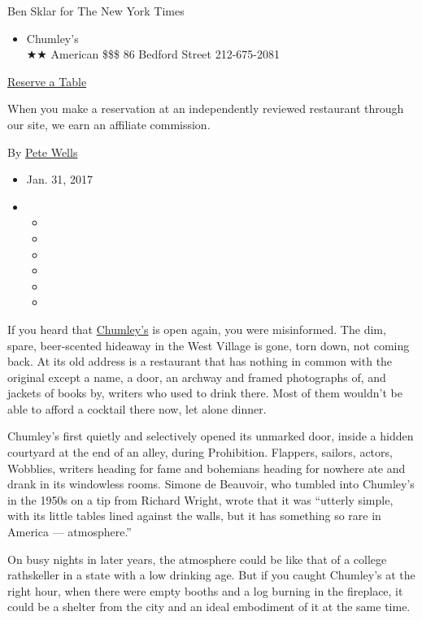 Ben Sklar for The New York Times

\begin{itemize}
\tightlist
\item
  Chumley's\\
  ★★ American \$\$\$ 86 Bedford Street 212-675-2081
\end{itemize}

\href{http://www.opentable.com/single.aspx?ref=4201\&rid=266758}{Reserve
a Table}

When you make a reservation at an independently reviewed restaurant
through our site, we earn an affiliate commission.

By \href{http://www.nytimes3xbfgragh.onion/by/pete-wells}{Pete Wells}

\begin{itemize}
\item
  Jan. 31, 2017
\item
  \begin{itemize}
  \item
  \item
  \item
  \item
  \item
  \item
  \end{itemize}
\end{itemize}

If you heard that \href{http://chumleysnewyork.com/}{Chumley's} is open
again, you were misinformed. The dim, spare, beer-scented hideaway in
the West Village is gone, torn down, not coming back. At its old address
is a restaurant that has nothing in common with the original except a
name, a door, an archway and framed photographs of, and jackets of books
by, writers who used to drink there. Most of them wouldn't be able to
afford a cocktail there now, let alone dinner.

Chumley's first quietly and selectively opened its unmarked door, inside
a hidden courtyard at the end of an alley, during Prohibition. Flappers,
sailors, actors, Wobblies, writers heading for fame and bohemians
heading for nowhere ate and drank in its windowless rooms. Simone de
Beauvoir, who tumbled into Chumley's in the 1950s on a tip from Richard
Wright, wrote that it was ``utterly simple, with its little tables lined
against the walls, but it has something so rare in America ---
atmosphere.''

On busy nights in later years, the atmosphere could be like that of a
college rathskeller in a state with a low drinking age. But if you
caught Chumley's at the right hour, when there were empty booths and a
log burning in the fireplace, it could be a shelter from the city and an
ideal embodiment of it at the same time.

